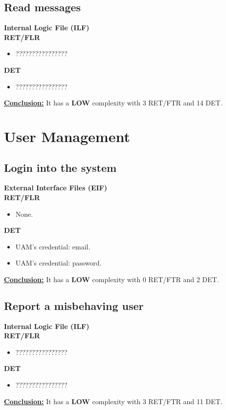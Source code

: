 \subsection{Read messages}
\textbf{Internal Logic File (ILF)} \\ 
\textbf{RET/FLR}
\begin{itemize}
\item ????????????????
\end{itemize}
\textbf{DET}
\begin{itemize}
\item ????????????????
\end{itemize}
\textbf{\underline{Conclusion:}} It has a \textbf{LOW} complexity with 3 RET/FTR and 14 DET.



\section{User Management}

\subsection{Login into the system}
\textbf{External Interface Files (EIF)} \\ 
\textbf{RET/FLR}
\begin{itemize}
\item None.
\end{itemize}
\textbf{DET}
\begin{itemize}
\item UAM's credential: email.
\item UAM's credential: password.
\end{itemize}
\textbf{\underline{Conclusion:}} It has a \textbf{LOW} complexity with 0 RET/FTR and 2 DET.

\subsection{Report a misbehaving user}
\textbf{Internal Logic File (ILF)} \\ 
\textbf{RET/FLR}
\begin{itemize}
\item ????????????????
\end{itemize}
\textbf{DET}
\begin{itemize}
\item ????????????????
\end{itemize}
\textbf{\underline{Conclusion:}} It has a \textbf{LOW} complexity with 3 RET/FTR and 11 DET.

